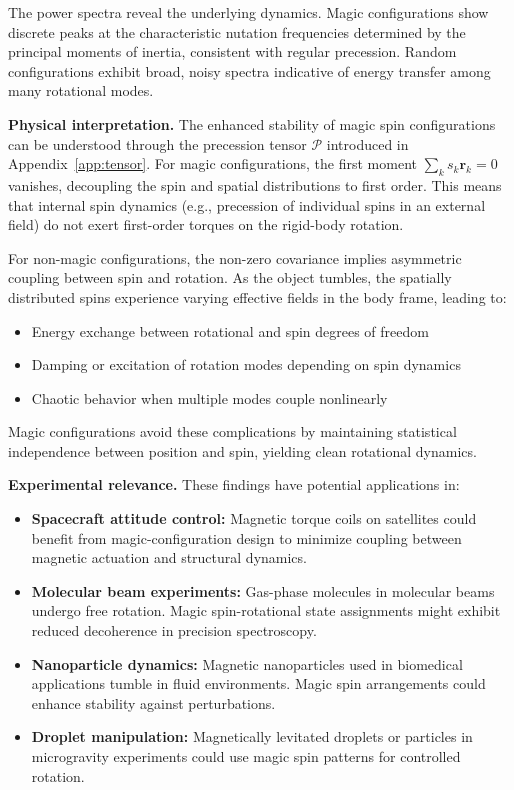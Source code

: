 The power spectra reveal the underlying dynamics. Magic configurations show discrete peaks at the characteristic nutation frequencies determined by the principal moments of inertia, consistent with regular precession. Random configurations exhibit broad, noisy spectra indicative of energy transfer among many rotational modes.

\textbf{Physical interpretation.} The enhanced stability of magic spin configurations can be understood through the precession tensor $\mathcal{P}$ introduced in Appendix~\ref{app:tensor}. For magic configurations, the first moment $\sum_k s_k \mathbf{r}_k = 0$ vanishes, decoupling the spin and spatial distributions to first order. This means that internal spin dynamics (e.g., precession of individual spins in an external field) do not exert first-order torques on the rigid-body rotation.

For non-magic configurations, the non-zero covariance implies asymmetric coupling between spin and rotation. As the object tumbles, the spatially distributed spins experience varying effective fields in the body frame, leading to:
\begin{itemize}
\item Energy exchange between rotational and spin degrees of freedom
\item Damping or excitation of rotation modes depending on spin dynamics
\item Chaotic behavior when multiple modes couple nonlinearly
\end{itemize}

Magic configurations avoid these complications by maintaining statistical independence between position and spin, yielding clean rotational dynamics.

\textbf{Experimental relevance.} These findings have potential applications in:

\begin{itemize}
\item \textbf{Spacecraft attitude control:} Magnetic torque coils on satellites could benefit from magic-configuration design to minimize coupling between magnetic actuation and structural dynamics.
\item \textbf{Molecular beam experiments:} Gas-phase molecules in molecular beams undergo free rotation. Magic spin-rotational state assignments might exhibit reduced decoherence in precision spectroscopy.
\item \textbf{Nanoparticle dynamics:} Magnetic nanoparticles used in biomedical applications tumble in fluid environments. Magic spin arrangements could enhance stability against perturbations.
\item \textbf{Droplet manipulation:} Magnetically levitated droplets or particles in microgravity experiments could use magic spin patterns for controlled rotation.
\end{itemize}

